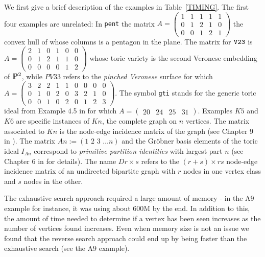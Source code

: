 \documentclass[11pt]{article}
\begin{document}
We first give a brief description of the examples in
Table~\ref{TIMING}. The first four examples are unrelated:
In {\tt pent} the matrix $A = \left( \begin{array}{ccccc} 
1 & 1 & 1 & 1 & 1 \\ 0 & 1 & 2 & 1 & 0 \\ 0 & 0 & 1 & 2 & 1
\end{array} \right )$ the convex hull of whose columns is a pentagon
in the plane.
The matrix for ${\tt V23}$ is $A = \left( \begin{array}{cccccc}
2 & 1 & 0 & 1 & 0 & 0 \\ 0 & 1 & 2 & 1 & 1 & 0 \\ 0 & 0 & 0 & 0 & 1 &
2 \end{array} \right )$ whose toric variety is the second Veronese 
embedding of ${\bf P}^2$, while $PV33$ refers to the {\em pinched 
Veronese}\/ surface for which  $A = \left (
\begin{array}{ccccccccc} 3 & 2 & 2 & 1 & 1 & 0 & 0 & 0 & 0 \\
0 & 1 & 0 & 2 & 0 & 3 & 2 & 1 & 0 \\ 0 & 0 & 1 & 0 & 2 & 0 & 1 & 2 & 3 
\end{array} \right )$. The symbol {\tt gti} stands for the generic 
toric ideal from Example 4.5 in \cite{PS} for which 
$A = \left( \begin{array}{cccc} 20 & 24 & 25 & 31 \end{array} \right
)$. Examples $K5$ and $K6$ are specific instances of $Kn$, the 
complete graph on $n$ vertices. The matrix associated to $Kn$ is the 
node-edge incidence matrix of the graph (see Chapter 9 in \cite{Stu}).
The matrix $An := \left( 1 \,\,2\,\,3\,\,\ldots n \right )$ and the
Gr\"obner basis elements of the toric ideal $I_{An}$ correspond to 
{\em primitive partition identities} with largest part $n$ (see Chapter 6 in
\cite{Stu} for details). The name $D r \times s$ refers to the $(r+s)
\times rs$ node-edge incidence matrix of an
undirected bipartite graph with $r$ nodes in one vertex class and $s$ nodes 
in the other.

The exhaustive search approach required a large amount of memory - in
the A9 example for instance, it was using about 600M by the end. In
addition to this, the amount of time needed to determine if a vertex
has been seen increases as the number of vertices found
increases. Even when memory size is not an issue we found that the 
reverse search approach could end up by being faster than 
the exhaustive search (see the A9 example).
 
\end{document}
